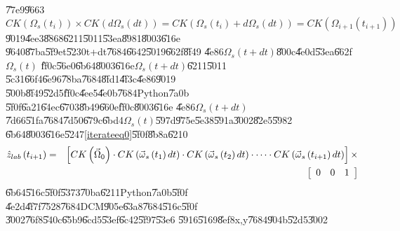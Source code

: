 \documentclass[12pt,a4paper]{article}
\begin{document}
\U{77e9}\U{9663}%
\begin{equation}
CK(\Omega _{s}(t_{i}))\times CK(d\Omega _{s}(dt))=CK(\Omega
_{s}(t_{i})+d\Omega _{s}(dt))=CK(\Omega _{i+1}(t_{i+1}))
\end{equation}%
\U{9019}\U{4ee3}\U{8868}\U{6211}\U{5011}\U{53ea}\U{8981}\U{8003}\U{616e}%
\U{9640}\U{87ba}\U{5f9e}t\U{5230}t+dt\U{7684}\U{6642}\U{5019}\U{662f}\U{8f49}%
\U{4e86}$\Omega _{s}(t+dt)$\U{800c}\U{4e0d}\U{53ea}\U{662f}$\Omega _{s}(t)$%
\U{ff0c}\U{56e0}\U{6b64}\U{8003}\U{616e}$\Omega _{s}(t+dt)$\U{6211}\U{5011}%
\U{5c31}\U{66f4}\U{6e96}\U{78ba}\U{7684}\U{8fd1}\U{4f3c}\U{4e86}\U{9019}%
\U{500b}\U{8f49}\U{52d5}\U{ff0c}\U{4ee5}\U{4e0b}\U{7684}Python\U{7a0b}%
\U{5f0f}\U{6a21}\U{64ec}\U{6703}\U{8b49}\U{660e}\U{ff0c}\U{8003}\U{616e}%
\U{4e86}$\Omega _{s}(t+dt)$\U{7d66}\U{51fa}\U{7684}\U{7d50}\U{679c}\U{6bd4}$%
\Omega _{s}(t)$\U{597d}\U{975e}\U{5e38}\U{591a}\U{3002}\U{82e5}\U{5982}%
\U{6b64}\U{8003}\U{616e}\U{5247}\ref{iterateeq0}\U{5f0f}\U{8b8a}\U{6210}%
\begin{eqnarray}
\hat{z}_{lab}\left( t_{i+1}\right) &=&\left[ CK\left( \vec{\Omega}%
_{0}\right) \cdot CK\left( \vec{\omega}_{s}\left( t_{1}\right) dt\right)
\cdot CK\left( \vec{\omega}_{s}\left( t_{2}\right) dt\right) \cdot \cdots
\cdot CK\left( \vec{\omega}_{s}\left( t_{i+1}\right) dt\right) \right] \times
\notag \\
&&\left[ 
\begin{array}{ccc}
0 & 0 & 1%
\end{array}%
\right]  \label{iterationCK}
\end{eqnarray}%
\U{6b64}\U{516c}\U{5f0f}\U{5373}\U{70ba}\U{6211}Python\U{7a0b}\U{5f0f}%
\U{4e2d}\U{4f7f}\U{7528}\U{7684}DCM\U{905e}\U{63a8}\U{7684}\U{516c}\U{5f0f}%
\U{3002}\U{76f8}\U{540c}\U{65b9}\U{6cd5}\U{53ef}\U{6c42}\U{5f97}\U{53e6}%
\U{5916}\U{5169}\U{8ef8}x,y\U{7684}\U{904b}\U{52d5}\U{3002}

\bigskip
\end{document}
